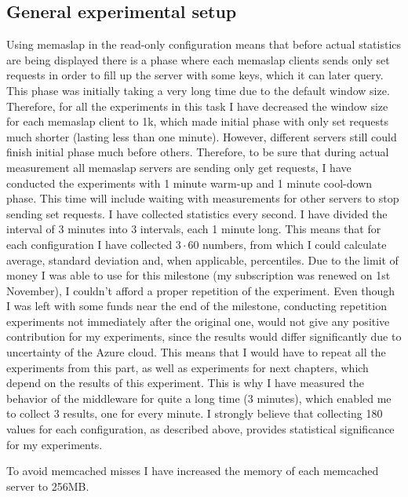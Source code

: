 \documentclass[11pt]{article}
\begin{document}
\subsection{General experimental setup}
Using memaslap in the read-only configuration means that before actual statistics are being displayed there is a phase where each memaslap clients sends only set requests in order to fill up the server with some keys, which it can later query. This phase was initially taking a very long time due to the default window size. Therefore, for all the experiments in this task I have decreased the window size for each memaslap client to 1k, which made initial phase with only set requests much shorter (lasting less than one minute). However, different servers still could finish initial phase much before others. Therefore, to be sure that during actual measurement all memaslap servers are sending only get requests, I have conducted the experiments with 1 minute warm-up and 1 minute cool-down phase.
This time will include waiting with measurements for other servers to stop sending set requests. I have collected statistics every second. I have divided the interval of 3 minutes into 3 intervals, each 1 minute long. This means that for each configuration I have collected $3\cdot60$ numbers, from which I could calculate average, standard deviation and, when applicable, percentiles. Due to the limit of money I was able to use for this milestone (my subscription was renewed on 1st November), I couldn't afford a proper repetition of the experiment. Even though I was left with some funds near the end of the milestone, conducting repetition experiments not immediately after the original one, would not give any positive contribution for my experiments, since the results would differ significantly due to uncertainty of the Azure cloud. This means that I would have to repeat all the experiments from this part, as well as experiments for next chapters, which depend on the results of this experiment. This is why I have measured the behavior of the middleware for quite a long time (3 minutes), which enabled me to collect 3 results, one for every minute. 
I strongly believe that collecting 180 values for each configuration, as described above, provides statistical significance for my experiments.   

To avoid memcached misses I have increased the memory of each memcached server to 256\;MB.
\end{document}
